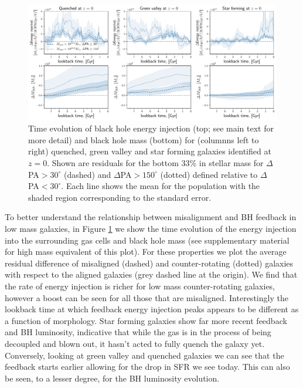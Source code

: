 \documentclass[fleqn,usenatbib]{mnras}
\begin{document}
\begin{figure}
	\includegraphics[width=\linewidth]{overall_population/LM_BH_residual_evo_Mstel10_2.pdf}
    \caption{Time evolution of black hole energy injection (top; see main text for more detail) and black hole mass (bottom) for (columnns left to right) quenched, green valley and star forming galaxies identified at $z=0$. Shown are residuals for the bottom 33\% in stellar mass for $\Delta$PA$ > 30^{\circ}$ (dashed) and $\Delta$PA$ > 150^{\circ}$ (dotted) defined relative to $\Delta$PA$ < 30^{\circ}$. Each line shows the mean for the population with the shaded region corresponding to the standard error.}
    \label{fig:LM_BH}
\end{figure}

To better understand the relationship between misalignment and BH feedback in low mass galaxies, in Figure \ref{fig:LM_BH} we show the time evolution of the energy injection into the surrounding gas cells and black hole mass (see supplementary material for high mass equivalent of this plot). For these properties we plot the average residual difference of misaligned (dashed) and counter-rotating (dotted) galaxies with respect to the aligned galaxies (grey dashed line at the origin). We find that the rate of energy injection is richer for low mass counter-rotating galaxies, however a boost can be seen for all those that are misaligned. Interestingly the lookback time at which feedback energy injection peaks appears to be different as a function of morphology. Star forming galaxies show far more recent feedback and BH luminosity, indicative that while the gas is in the process of being decoupled and blown out, it hasn't acted to fully quench the galaxy yet. Conversely, looking at green valley and quenched galaxies we can see that the feedback starts earlier allowing for the drop in SFR we see today. This can also be seen, to a lesser degree, for the BH luminosity evolution. 
\end{document}

